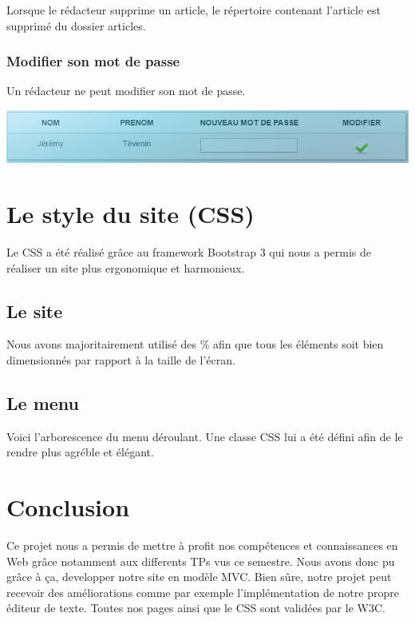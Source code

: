 \documentclass[hidelinks, 12pt,a4paper]{article}
\begin{document}
Lorsque le rédacteur supprime un article, le répertoire contenant l'article est supprimé du dossier articles.

\subsubsection{Modifier son mot de passe}
Un rédacteur ne peut modifier son mot de passe.\\
\begin{center}
\includegraphics[width=16cm]{images/modifauteur.png}\\
\end{center}


\newpage
\section{Le style du site (CSS)}
Le CSS a été réalisé grâce au framework Bootstrap 3 qui nous a permis de réaliser un site plus ergonomique et harmonieux.
\subsection{Le site}
Nous avons majoritairement utilisé des \% afin que tous les éléments soit bien dimensionnés par rapport à la taille de l'écran.
\subsection{Le menu}
Voici l'arborescence du menu déroulant. Une classe CSS lui a été défini afin de le rendre plus agréble et élégant.

\newpage
\section{Conclusion}
Ce projet nous a permis de mettre à profit nos compétences et connaissances en Web grâce notamment aux differents TPs vus ce semestre. Nous avons donc pu grâce à ça, developper notre site en modèle MVC. Bien sûre, notre projet peut recevoir des améliorations comme par exemple l'implémentation de notre propre éditeur de texte. Toutes nos pages ainsi que le CSS sont validées par le W3C.
\end{document}
